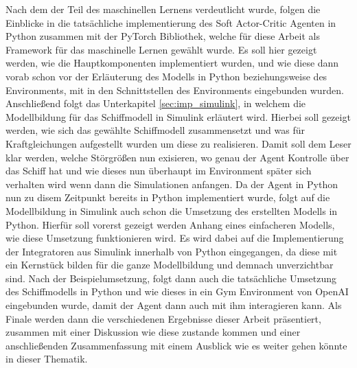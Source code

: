\documentclass[]{iat}
\begin{document}
Nach dem der Teil des maschinellen Lernens verdeutlicht wurde, folgen die Einblicke in die tatsächliche implementierung des Soft Actor-Critic Agenten in Python zusammen mit der PyTorch Bibliothek, welche für diese Arbeit als Framework für das maschinelle Lernen gewählt wurde. Es soll hier gezeigt werden, wie die Hauptkomponenten implementiert wurden, und wie diese dann vorab schon vor der Erläuterung des Modells in Python beziehungsweise des Environments, mit in den Schnittstellen des Environments eingebunden wurden. Anschließend folgt das Unterkapitel \ref{sec:imp_simulink}, in welchem die Modellbildung für das Schiffmodell in Simulink erläutert wird. Hierbei soll gezeigt werden, wie sich das gewählte Schiffmodell zusammensetzt und was für Kraftgleichungen aufgestellt wurden um diese zu realisieren. Damit soll dem Leser klar werden, welche Störgrößen nun exisieren, wo genau der Agent Kontrolle über das Schiff hat und wie dieses nun überhaupt im Environment später sich verhalten wird wenn dann die Simulationen anfangen. Da der Agent in Python nun zu disem Zeitpunkt bereits in Python implementiert wurde, folgt auf die Modellbildung in Simulink auch schon die Umsetzung des erstellten Modells in Python. Hierfür soll vorerst gezeigt werden Anhang eines einfacheren Modells, wie diese Umsetzung funktionieren wird. Es wird dabei auf die Implementierung der Integratoren aus Simulink innerhalb von Python eingegangen, da diese mit ein Kernstück bilden für die ganze Modellbildung und demnach unverzichtbar sind. Nach der Beispielumsetzung, folgt dann auch die tatsächliche Umsetzung des Schiffmodells in Python und wie dieses in ein Gym Environment von OpenAI eingebunden wurde, damit der Agent dann auch mit ihm interagieren kann. Als Finale werden dann die verschiedenen Ergebnisse dieser Arbeit präsentiert, zusammen mit einer Diskussion wie diese zustande kommen und einer anschließenden Zusammenfassung mit einem Ausblick wie es weiter gehen könnte in dieser Thematik.
\end{document}
